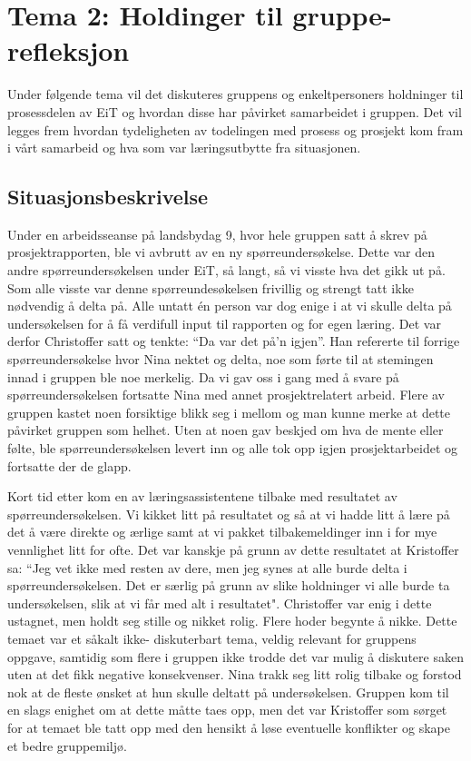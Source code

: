 \chapter{Tema 2: Holdinger til gruppe{-}\\refleksjon}

Under følgende tema vil det diskuteres gruppens og enkeltpersoners holdninger til prosessdelen av EiT og hvordan
disse har påvirket samarbeidet i gruppen. Det vil legges frem hvordan tydeligheten av todelingen med prosess og 
prosjekt kom fram i vårt samarbeid og hva som var læringsutbytte fra situasjonen. 

\section{Situasjonsbeskrivelse}

Under en arbeidsseanse på landsbydag 9, hvor hele gruppen satt å skrev på prosjektrapporten, ble vi avbrutt av
en ny spørreundersøkelse. Dette var den andre spørreundersøkelsen under EiT, så langt, så vi visste hva det gikk ut på.
Som alle visste var denne spørreundesøkelsen frivillig og strengt tatt ikke nødvendig å delta på. Alle untatt én person
var dog enige i at vi skulle delta på undersøkelsen for å få verdifull input til rapporten og for egen læring. Det var derfor
Christoffer satt og tenkte: ``Da var det på'n igjen''. Han refererte til forrige spørreundersøkelse hvor Nina nektet og delta,
noe som førte til at stemingen innad i gruppen ble noe merkelig. Da vi gav oss i gang med å svare på spørreundersøkelsen fortsatte Nina
med annet prosjektrelatert arbeid. Flere av gruppen kastet noen forsiktige blikk seg i mellom og man kunne merke at 
dette påvirket gruppen som helhet. Uten at noen gav beskjed om hva de mente eller følte, ble spørreundersøkelsen levert inn og 
alle tok opp igjen prosjektarbeidet og fortsatte der de glapp.

Kort tid etter kom en av læringsassistentene tilbake med resultatet av spørreundersøkelsen. Vi kikket litt på resultatet og 
så at vi hadde litt å lære på det å være direkte og ærlige samt at vi pakket tilbakemeldinger inn i for mye vennlighet litt for ofte.
Det var kanskje på grunn av dette resultatet at Kristoffer sa: ``Jeg vet ikke med resten av dere, men jeg synes at alle burde
delta i spørreundersøkelsen. Det er særlig på grunn av slike holdninger vi alle burde ta undersøkelsen, slik at vi får med alt
i resultatet". Christoffer var enig i dette ustagnet, men holdt seg stille og nikket rolig. Flere hoder begynte å nikke. 
Dette temaet var et  såkalt ikke- diskuterbart tema, veldig relevant for gruppens oppgave, 
samtidig som flere i gruppen ikke trodde det var mulig å diskutere saken uten at det fikk negative konsekvenser. 
\cite{Artikkel3} Nina 
trakk seg litt rolig tilbake og forstod nok at de fleste ønsket at hun skulle deltatt på undersøkelsen. Gruppen kom 
til en slags enighet om at dette måtte taes opp, men det var Kristoffer som sørget for at temaet ble tatt opp med den hensikt å løse eventuelle
konflikter og skape et bedre gruppemiljø.

